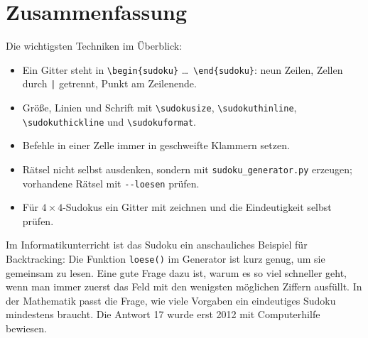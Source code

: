\section{Zusammenfassung}

Die wichtigsten Techniken im Überblick:

\begin{itemize}
	\item Ein Gitter steht in \texttt{\textbackslash begin\{sudoku\}} \dots\ \texttt{\textbackslash end\{sudoku\}}: neun Zeilen, Zellen durch \texttt{|} getrennt, Punkt am Zeilenende.
	\item Größe, Linien und Schrift mit \texttt{\textbackslash sudokusize}, \texttt{\textbackslash sudokuthinline}, \texttt{\textbackslash sudokuthickline} und \texttt{\textbackslash sudokuformat}.
	\item Befehle in einer Zelle immer in geschweifte Klammern setzen.
	\item Rätsel nicht selbst ausdenken, sondern mit \texttt{sudoku\_generator.py} erzeugen; vorhandene Rätsel mit \texttt{-{}-loesen} prüfen.
	\item Für $4\times4$-Sudokus ein Gitter mit \TikZ zeichnen und die Eindeutigkeit selbst prüfen.
\end{itemize}

Im Informatikunterricht ist das Sudoku ein anschauliches Beispiel für Backtracking: Die Funktion \texttt{loese()} im Generator ist kurz genug, um sie gemeinsam zu lesen. Eine gute Frage dazu ist, warum es so viel schneller geht, wenn man immer zuerst das Feld mit den wenigsten möglichen Ziffern ausfüllt. In der Mathematik passt die Frage, wie viele Vorgaben ein eindeutiges Sudoku mindestens braucht. Die Antwort 17 wurde erst 2012 mit Computerhilfe bewiesen.


